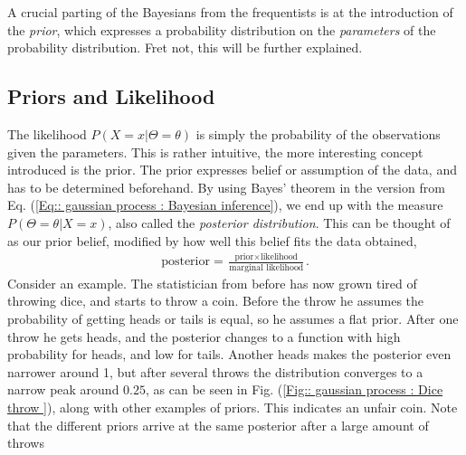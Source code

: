 \documentclass[twoside,english]{uiofysmaster}
\begin{document}
A crucial parting of the Bayesians from the frequentists is at the introduction of the \textit{prior}, which expresses a probability distribution on the \textit{parameters} of the probability distribution. Fret not, this will be further explained.

\subsection{Priors and Likelihood}

The likelihood $P(X = x |\Theta = \theta)$ is simply the probability of the observations given the parameters. This is rather intuitive, the more interesting concept introduced is the prior. The prior expresses belief or assumption of the data, and has to be determined beforehand. By using Bayes' theorem in the version from Eq. (\ref{Eq:: gaussian process : Bayesian inference}), we end up with the measure $P(\Theta = \theta | X = x)$, also called the \textit{posterior distribution}. This can be thought of as our prior belief, modified by how well this belief fits the data obtained,
\begin{align*}
\text{posterior} = \frac{\text{prior} \times \text{likelihood}}{\text{marginal likelihood}}.
\end{align*}
Consider an example. The statistician from before has now grown tired of throwing dice, and starts to throw a coin. Before the throw he assumes the probability of getting heads or tails is equal, so he assumes a flat prior. After one throw he gets heads, and the posterior changes to a function with high probability for heads, and low for tails. Another heads makes the posterior even narrower around 1, but after several throws the distribution converges to a narrow peak around $0.25$, as can be seen in Fig. (\ref{Fig:: gaussian process : Dice throw }), along with other examples of priors. This indicates an unfair coin. Note that the different priors arrive at the same posterior after a large amount of throws
\end{document}

